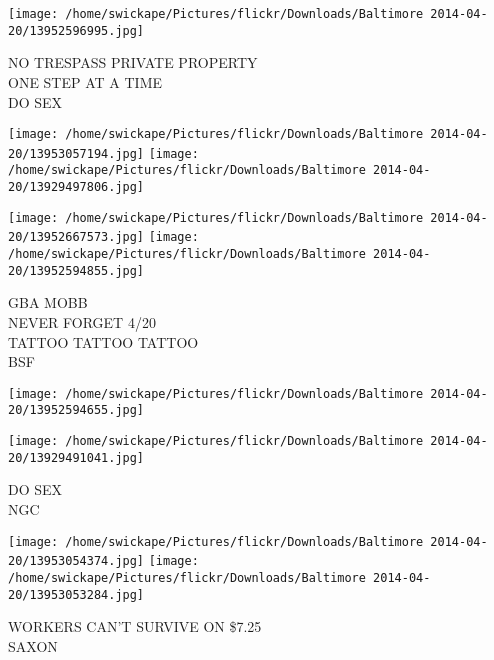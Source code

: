 \documentclass[10pt,letterpaper]{article}
\begin{document}
\vspace{0.25in}
\texttt{[image: /home/swickape/Pictures/flickr/Downloads/Baltimore 2014-04-20/13952596995.jpg]}

NO TRESPASS PRIVATE PROPERTY\\
ONE STEP AT A TIME\\
DO SEX
\pagebreak

\texttt{[image: /home/swickape/Pictures/flickr/Downloads/Baltimore 2014-04-20/13953057194.jpg]}
\texttt{[image: /home/swickape/Pictures/flickr/Downloads/Baltimore 2014-04-20/13929497806.jpg]}

\texttt{[image: /home/swickape/Pictures/flickr/Downloads/Baltimore 2014-04-20/13952667573.jpg]}
\texttt{[image: /home/swickape/Pictures/flickr/Downloads/Baltimore 2014-04-20/13952594855.jpg]}

GBA MOBB\\
NEVER FORGET 4/20\\
TATTOO TATTOO TATTOO\\
BSF
\pagebreak

\texttt{[image: /home/swickape/Pictures/flickr/Downloads/Baltimore 2014-04-20/13952594655.jpg]}

\vspace{0.25in}
\texttt{[image: /home/swickape/Pictures/flickr/Downloads/Baltimore 2014-04-20/13929491041.jpg]}

DO SEX\\
NGC
\pagebreak

\texttt{[image: /home/swickape/Pictures/flickr/Downloads/Baltimore 2014-04-20/13953054374.jpg]}
\texttt{[image: /home/swickape/Pictures/flickr/Downloads/Baltimore 2014-04-20/13953053284.jpg]}

WORKERS CAN'T SURVIVE ON \$7.25\\
SAXON
\pagebreak
\end{document}
